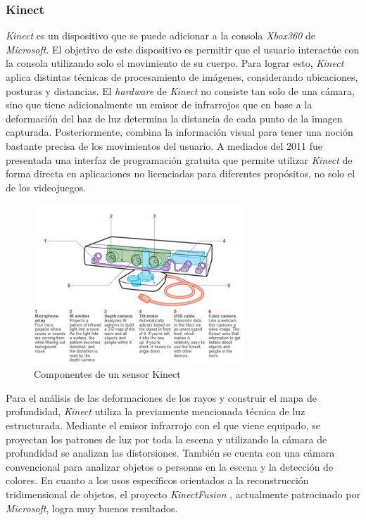 \subsubsection{Kinect}

\emph{Kinect} es un dispositivo que se puede adicionar a la consola \emph{Xbox360} de \emph{Microsoft}. El objetivo de este dispositivo es permitir que el usuario interactúe con la consola utilizando solo el movimiento de su cuerpo. Para lograr esto, \emph{Kinect} aplica distintas técnicas de procesamiento de imágenes, considerando ubicaciones, posturas y distancias. El \emph{hardware} de \emph{Kinect} no consiste tan solo de una cámara, sino que tiene adicionalmente un emisor de infrarrojos que en base a la deformación del haz de luz determina la distancia de cada punto de la imagen capturada. Posteriormente, combina la información visual para tener una noción bastante precisa de los movimientos del usuario. A mediados del 2011 fue presentada una interfaz de programación gratuita que permite utilizar \emph{Kinect} de forma directa en aplicaciones no licenciadas para diferentes propósitos, no solo el de los videojuegos.

\begin{figure}[H]
  \centering
    \includegraphics[width=0.7\textwidth]{./Cap2_videomapping/kinect.PNG}
  \caption{Componentes de un sensor Kinect}%
  \label{fig:Kinect}
\end{figure}

Para el análisis de las deformaciones de los rayos y construir el mapa de profundidad, \emph{Kinect} utiliza la previamente mencionada técnica de luz estructurada. Mediante el emisor infrarrojo con el que viene equipado, se proyectan los patrones de luz por toda la escena y utilizando la cámara de profundidad se analizan las distorsiones.
También se cuenta con una cámara convencional para analizar objetos o personas en la escena y la detección de colores.
En cuanto a los usos específicos orientados a la reconstrucción tridimensional de objetos, el proyecto \emph{KinectFusion} \cite{KinectFusion}, actualmente patrocinado por \emph{Microsoft}, logra muy buenos resultados.%

